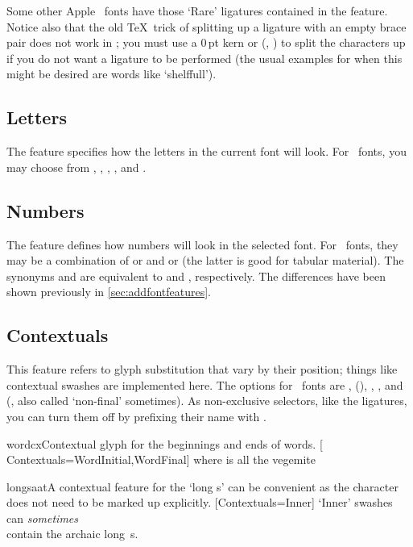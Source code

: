 \documentclass[a4paper]{l3doc}
\begin{document}
Some other Apple \AAT\ fonts have those `Rare' ligatures contained in
the  feature. Notice also that the old \TeX\ trick of
splitting up a ligature with an empty brace pair does not work in
\XeTeX; you must use a 0\,pt kern or  (\eg, ) to
split the characters up if you do not want a ligature to be performed (the usual examples for when this might be desired are words like `shelf\null full').

\subsection{Letters} \label{sec:aat-letters}
The  feature specifies how the letters in the current font
will look. For \AAT\ fonts, you may choose from ,
, , , and
.


\subsection{Numbers}
The  feature defines how numbers will look in the
selected font. For \AAT\ fonts, they may be a
combination of  or  and  or
 (the latter is good for tabular material). The synonyms
 and  are equivalent to  and
, respectively. The differences have been shown previously
in \vref{sec:addfontfeatures}.

\subsection{Contextuals} \label{sec:contextuals}
This feature refers to glyph substitution that vary by their position;
things like contextual swashes are implemented here.
The options for \AAT\ fonts are
,  (), ,
, and  (, also called `non-final' sometimes). As
non-exclusive selectors, like the ligatures, you can turn them off
by prefixing their name with .

\begin{Xexample}{wordcx}{Contextual glyph for the beginnings and ends of words.}
  \newfontface{}[%
    Contextuals={WordInitial,WordFinal}]
  \fancy where is all the vegemite
\end{Xexample}

\begin{Xexample}{longsaat}{A contextual feature for the `long s' can be convenient as the character does not need to be marked up explicitly.}
  [Contextuals=Inner]
  `Inner' swashes can \emph{sometimes}    \\
   contain the archaic long~s.
\end{Xexample}
\end{document}
